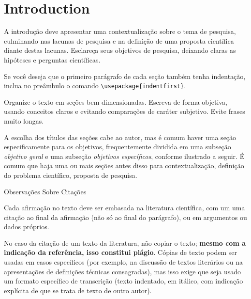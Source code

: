\documentclass[a4paper, 12pt]{ppgeb}
\makeatletter
\renewcommand{\section}{\@startsection
{section}
{1}
{0mm}
{-\baselineskip}
{0.5\baselineskip}
{\large\bfseries\scshape}}
\makeatother
\begin{document}
\begin{acronym}
\end{acronym}

\clearpage


\chapter{Introduction}

A introdução deve apresentar uma contextualização sobre o tema de pesquisa, culminando nas lacunas de pesquisa e na definição de uma proposta científica diante destas lacunas. Esclareça seus objetivos de pesquisa, deixando claras as hipóteses e perguntas científicas.

Se você deseja que o primeiro parágrafo de cada seção também tenha indentação, inclua no preâmbulo o comando \verb,\usepackage{indentfirst},.

Organize o texto em seções bem dimensionadas. Escreva de forma objetiva, usando conceitos claros e evitando comparações de caráter subjetivo. Evite frases muito longas.

A escolha dos títulos das seções cabe ao autor, mas é comum haver uma seção especificamente para os objetivos, frequentemente dividida em uma subseção \emph{objetivo geral} e uma subseção \emph{objetivos específicos}, conforme ilustrado a seguir. É comum que haja uma ou mais seções antes disso para contextualização, definição do problema científico, proposta de pesquisa.

\section{Observações Sobre Citações}

Cada afirmação no texto deve ser embasada na literatura científica, com um uma citação ao final da afirmação (não só ao final do parágrafo), ou em argumentos ou dados próprios.

No caso da citação de um texto da literatura, não copiar o texto; \textbf{mesmo com a indicação da referência, isso constitui plágio}. Cópias de texto podem ser usadas em casos específicos (por exemplo, na discussão de textos literários ou na apresentações de definições técnicas consagradas), mas isso exige que seja usado um formato específico de transcrição (texto indentado, em itálico, com indicação explícita de que se trata de texto de outro autor).
\end{document}
